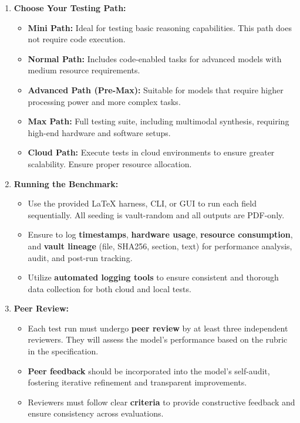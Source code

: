 \begin{enumerate}
  \item \textbf{Choose Your Testing Path:}
  \begin{itemize}
    \item \textbf{Mini Path:} Ideal for testing basic reasoning capabilities. This path does not require code execution.
    \item \textbf{Normal Path:} Includes code-enabled tasks for advanced models with medium resource requirements.
    \item \textbf{Advanced Path (Pre-Max):} Suitable for models that require higher processing power and more complex tasks.
    \item \textbf{Max Path:} Full testing suite, including multimodal synthesis, requiring high-end hardware and software setups.
    \item \textbf{Cloud Path:} Execute tests in cloud environments to ensure greater scalability. Ensure proper resource allocation.
  \end{itemize}

  \item \textbf{Running the Benchmark:}
  \begin{itemize}
    \item Use the provided LaTeX harness, CLI, or GUI to run each field sequentially. All seeding is vault-random and all outputs are PDF-only.
    \item Ensure to log \textbf{timestamps}, \textbf{hardware usage}, \textbf{resource consumption}, and \textbf{vault lineage} (file, SHA256, section, text) for performance analysis, audit, and post-run tracking.
    \item Utilize \textbf{automated logging tools} to ensure consistent and thorough data collection for both cloud and local tests.
  \end{itemize}

  \item \textbf{Peer Review:}
  \begin{itemize}
    \item Each test run must undergo \textbf{peer review} by at least three independent reviewers. They will assess the model's performance based on the rubric in the specification.
    \item \textbf{Peer feedback} should be incorporated into the model's self-audit, fostering iterative refinement and transparent improvements.
    \item Reviewers must follow clear \textbf{criteria} to provide constructive feedback and ensure consistency across evaluations.
  \end{itemize}
\end{enumerate}

